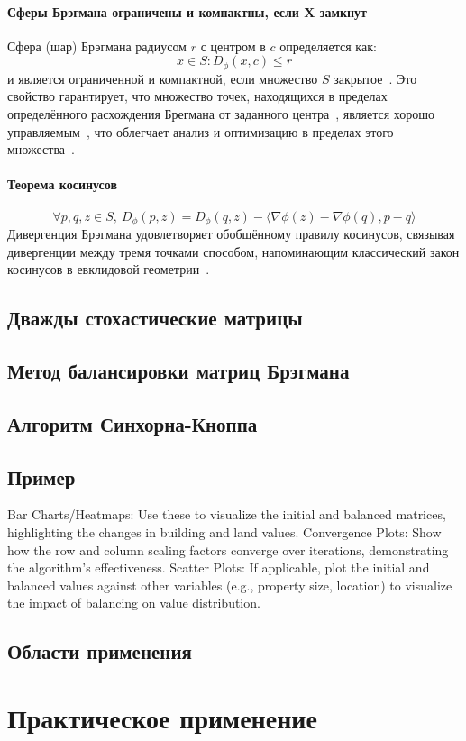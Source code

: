 \documentclass[12pt]{scrartcl}
\begin{document}
\paragraph{Сферы Брэгмана ограничены и компактны, если X замкнут}\label{par:bregman_balls}
Сфера (шар) Брэгмана радиусом $r$ с центром в $c$ определяется как:
\begin{equation}
    {x \in S:D_{\phi}(x,c) \leq r}
\end{equation}
и является ограниченной и компактной, если множество $S$ закрытое~\cite{Nielsen2007}. Это свойство гарантирует, что множество точек, находящихся в пределах определённого расхождения Брегмана от заданного центра~\cite{Nielsen2011}, является хорошо управляемым~\cite{Nielsen2006}, что облегчает анализ и оптимизацию в пределах этого множества~\cite{Boissonnat2010}.
\paragraph{Теорема косинусов}\label{par:cosine_rule}
\begin{equation}
    \forall p,q,z \in S,\ D_{\phi}(p,z) = D_{\phi}(q,z) - \langle \nabla \phi (z) - \nabla \phi (q), p -q \rangle
\end{equation}
Дивергенция Брэгмана удовлетворяет обобщённому правилу косинусов, связывая дивергенции между тремя точками способом, напоминающим классический закон косинусов в евклидовой геометрии~\cite{Adamcik2014}.

\subsection{Дважды стохастические матрицы}
\subsection{Метод балансировки матриц Брэгмана}
\subsection{Алгоритм Синхорна-Кноппа}
\subsection{Пример}

Bar Charts/Heatmaps: Use these to visualize the initial and balanced matrices, highlighting the changes in building and land values.
Convergence Plots: Show how the row and column scaling factors converge over iterations, demonstrating the algorithm's effectiveness.
Scatter Plots: If applicable, plot the initial and balanced values against other variables (e.g., property size, location) to visualize the impact of balancing on value distribution.

\subsection{Области применения}

\section{Практическое применение}\label{sec:Case}






\printbibliography
\end{document}
